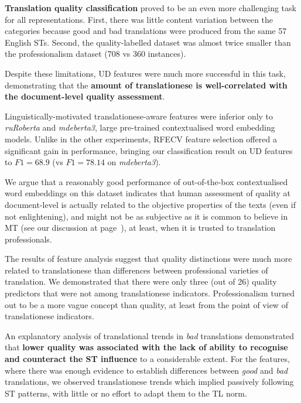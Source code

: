\textbf{Translation quality classification} proved to be an even more challenging task for all representations. First, there was little content variation between the categories because good and bad translations were produced from the same 57 English STs. Second, the quality-labelled dataset was almost twice smaller than the professionalism dataset (708 vs 360 instances). %

Despite these limitations, UD features were much more successful in this task, demonstrating that the \textbf{amount of translationese is well-correlated with the document-level quality assessment}. 

\label{pg:translationese_indicators_work_for_binary_labels}
Linguistically-motivated translationese-aware features were inferior only to \textit{ruRoberta} and \textit{mdeberta3}, large pre-trained contextualised word embedding models. Unlike in the other experiments, RFECV feature selection offered a significant gain in performance, bringing our classification result on UD features to $F1=68.9$ (vs $F1=78.14$ on \textit{mdeberta3}).

We argue that a reasonably good performance of out-of-the-box contextualised word embeddings on this dataset indicates that human assessment of quality at document-level is actually related to the objective properties of the texts (even if not enlightening), and might not be as subjective as it is common to believe in MT (see our discussion at page~\pageref{pg:pessimism}), at least, when it is trusted to translation professionals. 

The results of feature analysis suggest that quality distinctions were much more related to translationese than differences between professional varieties of translation. 
We demonstrated that there were only three (out of 26) quality predictors that were not among translationese indicators. Professionalism turned out to be a more vague concept than quality, at least from the point of view of translationese indicators.

An explanatory analysis of translational trends in \textit{bad} translations demonstrated that \textbf{lower quality was associated with the lack of ability to recognise and counteract the ST influence} to a considerable extent. For the features, where there was enough evidence to establish differences between \textit{good} and \textit{bad} translations, we observed translationese trends which implied passively following ST patterns, with little or no effort to adapt them to the TL norm.
 
